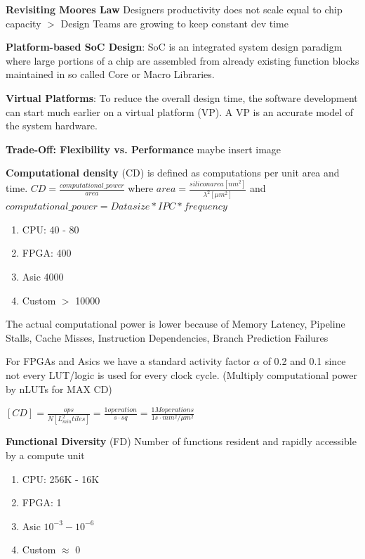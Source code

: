 \documentclass[english]{latex4ei/latex4ei_sheet}
\begin{document}
\textbf{Revisiting Moores Law} Designers productivity does not scale equal to chip capacity $>$ Design Teams are growing to keep constant dev time

\textbf{Platform-based SoC Design}: SoC is an integrated system design paradigm where large portions of a chip are assembled from already existing function blocks maintained in so called Core or Macro Libraries.

\textbf{Virtual Platforms}: To reduce the overall design time, the software development can start much earlier on a virtual platform (VP). A VP is an accurate model of the system hardware.

\textbf{Trade-Off: Flexibility vs. Performance} maybe insert image

\textbf{Computational density} (CD) is defined as computations per unit area and time.
$CD = \frac{computational\_power}{area}$ where $area = \frac{siliconarea [nm^2]}{\lambda^2 [\mu m^2]}$ and $computational\_power = Data size * IPC * frequency$

\begin{enumerate}
	\item CPU: 40 - 80
	\item FPGA: 400
	\item Asic 4000
	\item Custom  $>$ 10000
\end{enumerate}

The actual computational power is lower because of Memory Latency, Pipeline Stalls, Cache Misses, Instruction Dependencies, Branch Prediction Failures

For FPGAs and Asics we have a standard activity factor $\alpha$ of 0.2 and 0.1 since not every LUT/logic is used for every clock cycle. (Multiply computational power by nLUTs for MAX CD)

$[CD] = \frac{ops}{N [L_{min}^2 tiles]} = \frac{1 operation}{s \cdot sq}
	= \frac{1M operations}{1s \cdot mm^2 / \mu m^2}$

\textbf{Functional Diversity} (FD) Number of functions resident and rapidly accessible by a compute unit

\begin{enumerate}
	\item CPU: 256K - 16K
	\item FPGA: 1
	\item Asic $10^{-3}  - 10^{-6}$
	\item Custom  $\approx$ 0
\end{enumerate}
\end{document}
